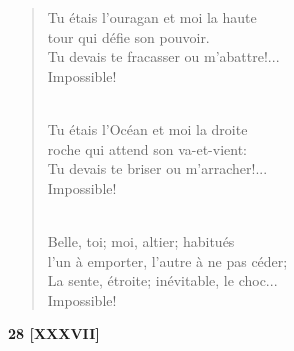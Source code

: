 \documentclass[a4paper,12pt]{book}
\begin{document}
\begin{verse}
Tu étais l'ouragan et moi la haute \\
tour qui défie son pouvoir. \\
Tu devais te fracasser ou m'abattre!... \\
Impossible! \\ \

Tu étais l'Océan et moi la droite \\
roche qui attend son va-et-vient: \\
Tu devais te briser ou m'arracher!... \\
Impossible! \\ \

Belle, toi; moi, altier; habitués \\
l'un à emporter, l'autre à ne pas céder; \\
La sente, étroite; inévitable, le choc... \\
Impossible! \\
\end{verse}

\bigskip

\begin{center} {\bf 28 [XXXVII]} \end{center}
\end{document}
